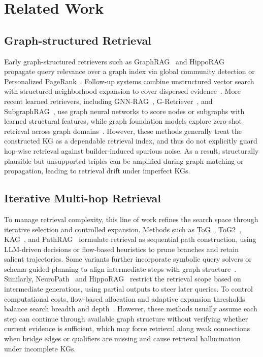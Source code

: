 \documentclass{article}
\theoremstyle{plain}
\theoremstyle{definition}
\theoremstyle{remark}
\begin{document}
\section{Related Work}

\subsection{Graph-structured Retrieval}
Early graph-structured retrievers such as GraphRAG~\cite{graphrag1} and HippoRAG~\cite{hipporag} propagate query relevance over a graph index via global community detection or Personalized PageRank~\cite{page1999pagerank}. Follow-up systems combine unstructured vector search with structured neighborhood expansion to cover dispersed evidence~\cite{lightrag}. More recent learned retrievers, including GNN-RAG~\cite{GNN-RAG}, G-Retriever~\cite{G-retrieval}, and SubgraphRAG~\cite{subgraphrag}, use graph neural networks to score nodes or subgraphs with learned structural features, while graph foundation models explore zero-shot retrieval across graph domains~\cite{gfm-rag}. However, these methods generally treat the constructed KG as a dependable retrieval index, and thus do not explicitly guard hop-wise retrieval against builder-induced spurious noise. As a result, structurally plausible but unsupported triples can be amplified during graph matching or propagation, leading to retrieval drift under imperfect KGs.

\subsection{Iterative Multi-hop Retrieval}
To manage retrieval complexity, this line of work refines the search space through iterative selection and controlled expansion. Methods such as ToG~\cite{tog}, ToG2~\cite{tog2}, KAG~\cite{kag}, and PathRAG~\cite{pathrag} formulate retrieval as sequential path construction, using LLM-driven decisions or flow-based heuristics to prune branches and retain salient trajectories. Some variants further incorporate symbolic query solvers or schema-guided planning to align intermediate steps with graph structure~\cite{youturag}. Similarly, NeuroPath~\cite{neuropath} and HippoRAG~\cite{hipporag} restrict the retrieval scope based on intermediate generations, using partial outputs to steer later queries. To control computational costs, flow-based allocation and adaptive expansion thresholds balance search breadth and depth~\cite{pathrag}. However, these methods usually assume each step can continue through available graph structure without verifying whether current evidence is sufficient, which may force retrieval along weak connections when bridge edges or qualifiers are missing and cause retrieval hallucination under incomplete KGs.
\end{document}
